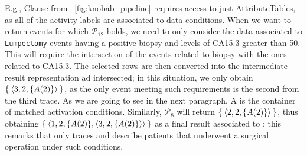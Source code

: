 E.g., Clause  from \figurename~\ref{fig:knobab_pipeline} requires access to just \textsf{AttributeTable}s, as all of the activity labels are associated to data conditions. When we want to return events for which $\mathcal{P}_{12}$ holds, we need to only consider the data associated to \texttt{Lumpectomy} events having a positive biopsy and levels of CA15.3 greater than 50. This will require the intersection of the events related to biopsy with the ones related to CA15.3. The selected rows are then  converted into the intermediate result representation ad intersected; in this situation, we only obtain $\Set{\braket{3,2,\{A(2)\}}}$, as the only event meeting such requirements is the second from the third trace. 
As we are going to see in the next paragraph, A is the container of matched activation conditions. 
Similarly, $\mathcal{P}_{8}$ will return $\Set{\braket{2,2,\{A(2)\}}}$, thus obtaining $\Set{\braket{1,2,\{A(2)\},\braket{3,2,\{A(2)\}}}}$ as a final result associated to : this remarks that only traces  and  describe patients that underwent a surgical operation under such conditions.
